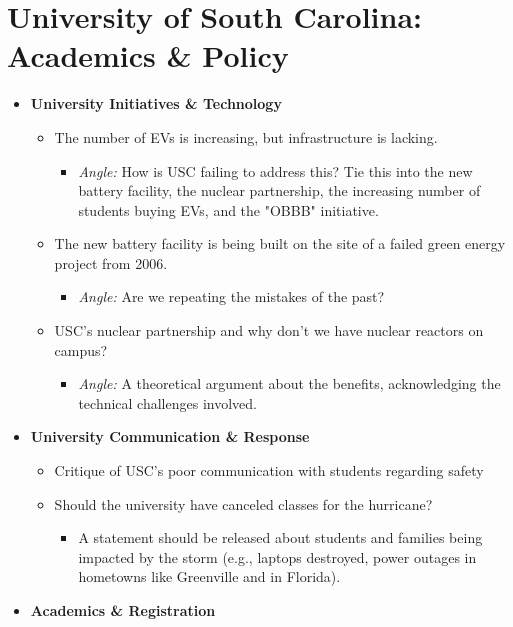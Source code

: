 \documentclass{article}
\begin{document}
\section*{University of South Carolina: Academics \& Policy}

\begin{itemize}
\item
  \textbf{University Initiatives \& Technology}

  \begin{itemize}
  \item
    The number of EVs is increasing, but infrastructure is lacking.

    \begin{itemize}
    \item
      \emph{Angle:} How is USC failing to address this? Tie this into
      the new battery facility, the nuclear partnership, the increasing
      number of students buying EVs, and the "OBBB" initiative.
    \end{itemize}
  \item
    The new battery facility is being built on the site of a failed
    green energy project from 2006.

    \begin{itemize}
    \item
      \emph{Angle:} Are we repeating the mistakes of the past?
    \end{itemize}
  \item
    USC's nuclear partnership and why
    don't we have nuclear reactors on campus?

    \begin{itemize}
    \item
      \emph{Angle:} A theoretical argument about the benefits,
      acknowledging the technical challenges involved.
    \end{itemize}
  \end{itemize}
\item
  \textbf{University Communication \& Response}

  \begin{itemize}
  \item
    Critique of USC's poor communication with students
    regarding safety
  \item
    Should the university have canceled classes for the hurricane?

    \begin{itemize}
    \item
      A statement should be released about students and families being
      impacted by the storm (e.g., laptops destroyed, power outages in
      hometowns like Greenville and in Florida).
    \end{itemize}
  \end{itemize}
\item
  \textbf{Academics \& Registration}


\end{itemize}
\end{document}
